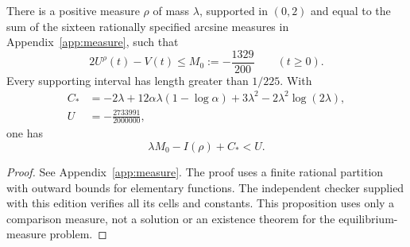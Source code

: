 \begin{proposition}
\label{prop:comparison}
There is a positive measure $\rho$ of mass $\lambda$, supported in
$(0,2)$ and equal to the sum of the sixteen rationally specified arcsine
measures in Appendix~\ref{app:measure}, such that
\begin{equation}\label{eq:potentialbound}
 2U^\rho(t)-V(t)\le M_0:=-\frac{1329}{200}\qquad(t\ge0).
\end{equation}
Every supporting interval has length greater than $1/225$. With
\begin{align}
 C_*&=-2\lambda+12\alpha\lambda(1-\log\alpha)
                  +3\lambda^2-2\lambda^2\log(2\lambda),\label{eq:Cstar}\\
 U&=-\frac{2733991}{2000000},\label{eq:Uconstant}
\end{align}
one has
\begin{equation}\label{eq:energyconstant}
 \lambda M_0-I(\rho)+C_*<U.
\end{equation}
\end{proposition}
\begin{proof}
See Appendix~\ref{app:measure}. The proof uses a finite rational
partition with outward bounds for elementary functions. The independent
checker supplied with this edition verifies all its cells and constants.
This proposition uses only a comparison measure, not a solution or an
existence theorem for the equilibrium-measure problem.
\end{proof}

